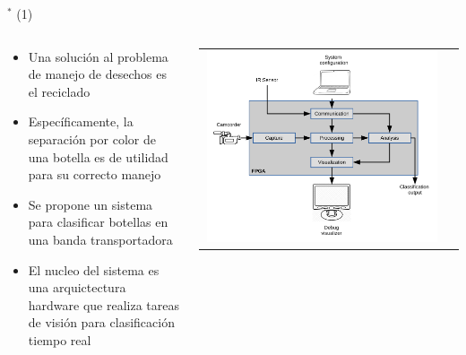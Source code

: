 
\begin{frame}{$^*$  (1)}
\begin{columns}
\begin{column}{0.6\textwidth}
	\begin{itemize}
		\item Una solución al problema de manejo de desechos es el reciclado
        \item Específicamente, la separación por color de una botella es de utilidad para su correcto manejo
        \item Se propone un sistema para clasificar botellas en una banda transportadora
        \item El nucleo del sistema es una arquictectura hardware que realiza tareas de visión para clasificación tiempo real 
	\end{itemize}
\end{column}
\begin{column}{0.4\textwidth}  
\begin{center}
     \begin{tabular}{cc}
         \includegraphics[width=0.98\textwidth]{2022_BottleClassifier/figs/MainModules.pdf}\\         
      \end{tabular}
\end{center}
\end{column} 
\end{columns} 
\end{frame}


